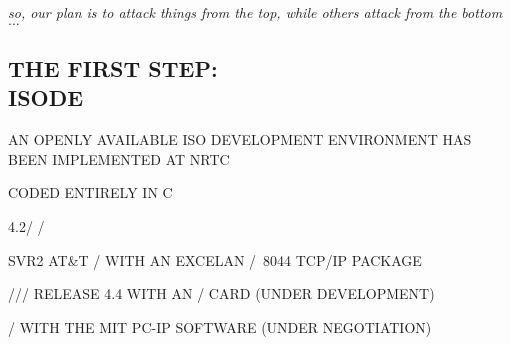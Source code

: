 \begin{bwslide}
\vskip-0.5in
\end{bwslide}


\begin{note}\em
so, our plan is to attack things from the top,
while others attack from the bottom$\ldots$
\end{note}


\begin{bwslide}
\part	{THE FIRST STEP:\\ ISODE}\bf

\begin{nrtc}
\item	AN OPENLY AVAILABLE ISO DEVELOPMENT
	ENVIRONMENT HAS BEEN IMPLEMENTED AT NRTC

\item	CODED ENTIRELY IN C
\end{nrtc}
\end{bwslide}


\begin{bwslide}

\begin{nrtc}
\item	4.2\bsd/ \unix/
\item	SVR2 AT\&T \unix/ WITH AN EXCELAN \exos/~8044 TCP/IP PACKAGE
\item	\vax//\vms/ RELEASE 4.4 WITH AN \exos/ CARD (UNDER DEVELOPMENT)
\item	\pcdos/ WITH THE MIT PC-IP SOFTWARE (UNDER NEGOTIATION)
\end{nrtc}

\end{bwslide}


